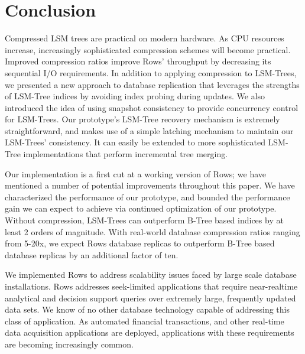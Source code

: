 \documentclass{sig-alternate-sigmod08}
\newcommand{\rows}{Rows\xspace}
\newcommand{\rowss}{Rows'\xspace}
\begin{document}
\section{Conclusion}

Compressed LSM trees are practical on modern hardware.  As CPU
resources increase, increasingly sophisticated compression schemes
will become practical.  Improved compression ratios improve \rowss
throughput by decreasing its sequential I/O requirements.  In addition
to applying compression to LSM-Trees, we presented a new approach to
database replication that leverages the strengths of LSM-Tree indices
by avoiding index probing during updates.  We also introduced the idea of using
snapshot consistency to provide concurrency control for LSM-Trees.
Our prototype's LSM-Tree recovery mechanism is extremely
straightforward, and makes use of a simple latching mechanism to
maintain our LSM-Trees' consistency.  It can easily be extended to
more sophisticated LSM-Tree implementations that perform incremental
tree merging.

Our implementation is a first cut at a working version of \rows; we
have mentioned a number of potential improvements throughout this
paper.  We have characterized the performance of our prototype, and
bounded the performance gain we can expect to achieve via continued
optimization of our prototype.  Without compression, LSM-Trees can outperform
B-Tree based indices by at least 2 orders of magnitude.  With real-world
database compression ratios ranging from 5-20x, we expect \rows
database replicas to outperform B-Tree based database replicas by an
additional factor of ten.

We implemented \rows to address scalability issues faced by large
scale database installations.  \rows addresses seek-limited
applications that require near-realtime analytical and decision support
queries over extremely large, frequently updated data sets.  We know
of no other database technology capable of addressing this class of
application.  As automated financial transactions, and other real-time
data acquisition applications are deployed, applications with these
requirements are becoming increasingly common.


%
%
\balancecolumns %
\end{document}
